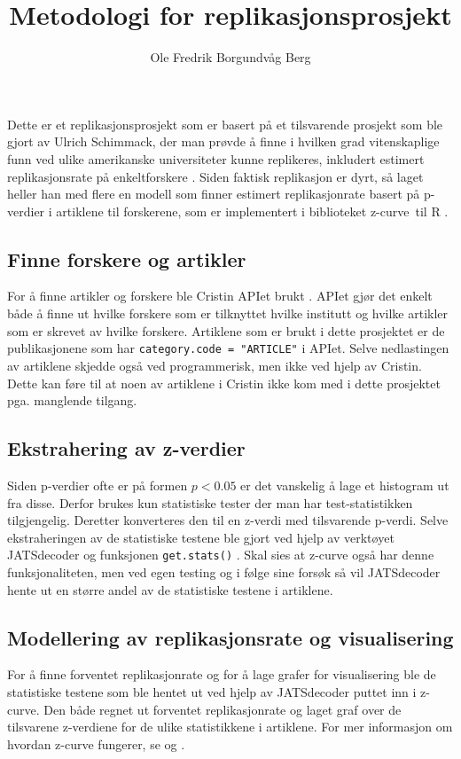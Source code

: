 \documentclass[doc,norsk]{apa7}
\title{Metodologi for replikasjonsprosjekt}
\author{Ole Fredrik Borgundvåg Berg}
\affiliation{NTNU}
\begin{document}
\maketitle

Dette er et replikasjonsprosjekt som er basert på et tilsvarende prosjekt som ble gjort av Ulrich Schimmack, der man prøvde å finne i hvilken grad vitenskaplige funn ved ulike amerikanske universiteter kunne replikeres, inkludert estimert replikasjonsrate på enkeltforskere \parencite{amerikansk-ranking}. Siden faktisk replikasjon er dyrt, så laget heller han med flere en modell som finner estimert replikasjonrate basert på p-verdier i artiklene til forskerene, som er implementert i biblioteket \guillemotleft z-curve\guillemetright\ til R \parencite{z-curve-modell, z-curve-implementasjon}.

\subsection{Finne forskere og artikler}
For å finne artikler og forskere ble Cristin APIet brukt \parencite{cristin-api}. APIet gjør det enkelt både å finne ut hvilke forskere som er tilknyttet hvilke institutt og hvilke artikler som er skrevet av hvilke forskere. Artiklene som er brukt i dette prosjektet er de publikasjonene som har \texttt{category.code = "ARTICLE"} i APIet. Selve nedlastingen av artiklene skjedde også ved programmerisk, men ikke ved hjelp av Cristin. Dette kan føre til at noen av artiklene i Cristin ikke kom med i dette prosjektet pga. manglende tilgang.

\subsection{Ekstrahering av z-verdier}
Siden p-verdier ofte er på formen $p < 0.05$ er det vanskelig å lage et histogram ut fra disse. Derfor brukes kun statistiske tester der man har test-statistikken tilgjengelig. Deretter konverteres den til en z-verdi med tilsvarende p-verdi. Selve ekstraheringen av de statistiske testene ble gjort ved hjelp av verktøyet JATSdecoder og funksjonen \texttt{get.stats()} \parencite{jatsdecoder}. Skal sies at z-curve også har denne funksjonaliteten, men ved egen testing og i følge \textcite{jatsdecoder} sine forsøk så vil JATSdecoder hente ut en større andel av de statistiske testene i artiklene.

\subsection{Modellering av replikasjonsrate og visualisering}
For å finne forventet replikasjonrate og for å lage grafer for visualisering ble de statistiske testene som ble hentet ut ved hjelp av JATSdecoder puttet inn i z-curve. Den både regnet ut forventet replikasjonrate og laget graf over de tilsvarene z-verdiene for de ulike statistikkene i artiklene. For mer informasjon om hvordan z-curve fungerer, se \textcite{z-curve-modell} og \textcite{z-curve-implementasjon}. 
 
\printbibliography
\end{document}
